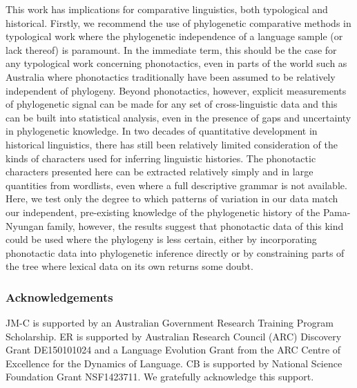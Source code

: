 This work has implications for comparative linguistics, both typological and historical. Firstly, we recommend the use of phylogenetic comparative methods in typological work where the phylogenetic independence of a language sample (or lack thereof) is paramount. In the immediate term, this should be the case for any typological work concerning phonotactics, even in parts of the world such as Australia where phonotactics traditionally have been assumed to be relatively independent of phylogeny. Beyond phonotactics, however, explicit measurements of phylogenetic signal can be made for any set of cross-linguistic data and this can be built into statistical analysis, even in the presence of gaps and uncertainty in phylogenetic knowledge. In two decades of quantitative development in historical linguistics, there has still been relatively limited consideration of the kinds of characters used for inferring linguistic histories. The phonotactic characters presented here can be extracted relatively simply and in large quantities from wordlists, even where a full descriptive grammar is not available. Here, we test only the degree to which patterns of variation in our data match our independent, pre-existing knowledge of the phylogenetic history of the Pama-Nyungan family, however, the results suggest that phonotactic data of this kind could be used where the phylogeny is less certain, either by incorporating phonotactic data into phylogenetic inference directly or by constraining parts of the tree where lexical data on its own returns some doubt.

\hypertarget{Acknowledgements}{%
\subsubsection{Acknowledgements}\label{Acknowledgements}}

JM-C is supported by an Australian Government Research Training Program Scholarship. ER is supported by Australian Research Council (ARC) Discovery Grant DE150101024 and a Language Evolution Grant from the ARC Centre of Excellence for the Dynamics of Language. CB is supported by National Science Foundation Grant NSF1423711. We gratefully acknowledge this support.

